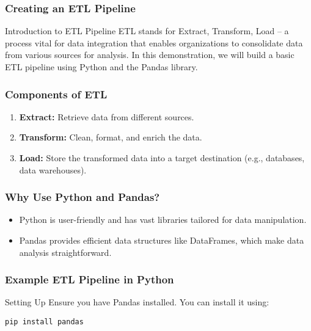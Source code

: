 \documentclass[aspectratio=169]{beamer}
\begin{document}
\begin{frame}[fragile]
    \frametitle{Creating an ETL Pipeline}
    \begin{block}{Introduction to ETL Pipeline}
        ETL stands for Extract, Transform, Load – a process vital for data integration that enables organizations to consolidate data from various sources for analysis.
        In this demonstration, we will build a basic ETL pipeline using Python and the Pandas library.
    \end{block}
\end{frame}

\begin{frame}
    \frametitle{Components of ETL}
    \begin{enumerate}
        \item \textbf{Extract:} Retrieve data from different sources.
        \item \textbf{Transform:} Clean, format, and enrich the data.
        \item \textbf{Load:} Store the transformed data into a target destination (e.g., databases, data warehouses).
    \end{enumerate}
\end{frame}

\begin{frame}
    \frametitle{Why Use Python and Pandas?}
    \begin{itemize}
        \item Python is user-friendly and has vast libraries tailored for data manipulation.
        \item Pandas provides efficient data structures like DataFrames, which make data analysis straightforward.
    \end{itemize}
\end{frame}

\begin{frame}[fragile]
    \frametitle{Example ETL Pipeline in Python}
    \begin{block}{Setting Up}
        Ensure you have Pandas installed. You can install it using:
        \begin{lstlisting}
pip install pandas
        \end{lstlisting}
    \end{block}
\end{frame}
\end{document}
